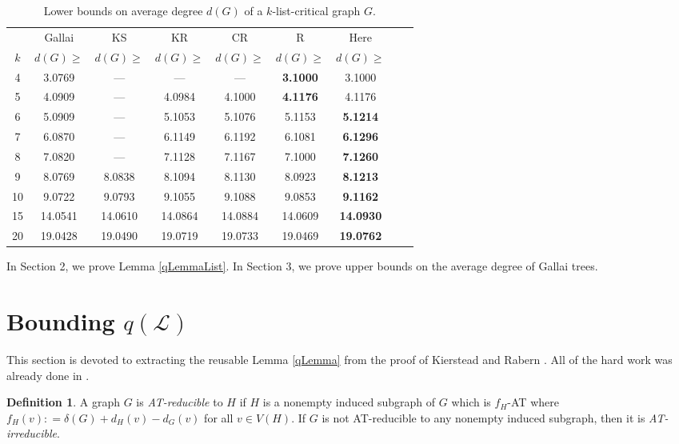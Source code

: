 \documentclass[10pt]{article}
\theoremstyle{plain}
\theoremstyle{definition}
\newtheorem{defn}{Definition}
\theoremstyle{remark}
\newcommand{\fancy}[1]{\mathcal{#1}}
\renewcommand{\L}{\fancy{L}}
\newcommand{\DefinedAs}{\mathrel{\mathop:}=}
\begin{document}
\begin{table}
	\begin{center}
		\begin{tabular}{|c|c|c|c|c|c|c|c|c|}
			\hline
			& Gallai \cite{gallai1963kritische}
			& KS \cite{kostochkastiebitzedgesincriticalgraph} 
			& KR \cite{OreVizing}
			& CR \cite{DischargingLowerBound}
			& R \cite{Better4ListCriticalBound}
			& Here \\
			$k$ & $d(G) \ge$ & $d(G) \ge$ & $d(G) \ge$ & $d(G) \ge$ & $d(G) \ge$ & $d(G) \ge$\\
			\hline 
			4 & 3.0769 & --- & --- & --- & \bf{3.1000} & 3.1000\\
			5 & 4.0909 & --- & 4.0984 & 4.1000 & \bf{4.1176} & 4.1176\\
			6 & 5.0909 & --- & 5.1053 & 5.1076 & 5.1153 & \bf{5.1214}\\
			7 & 6.0870 & --- & 6.1149 & 6.1192} & 6.1081 & \bf{6.1296}\\
			8 & 7.0820 & --- & 7.1128 & 7.1167} & 7.1000 & \bf{7.1260}\\
			9 & 8.0769 & 8.0838 & 8.1094 & 8.1130} & 8.0923 & \bf{8.1213}\\
			10 & 9.0722 & 9.0793 & 9.1055 & 9.1088} & 9.0853 & \bf{9.1162}\\
			15 & 14.0541 & 14.0610 & 14.0864 & 14.0884} & 14.0609 & \bf{14.0930}\\
			20 & 19.0428 & 19.0490 & 19.0719 & 19.0733} & 19.0469 & \bf{19.0762}\\
			\hline
		\end{tabular}
	\end{center}
	\caption{Lower bounds on average degree $d(G)$ of a $k$-list-critical graph $G$.}
	\label{TheTable}
\end{table}

In Section 2, we prove Lemma \ref{qLemmaList}.
In Section 3, we prove upper bounds on the average degree of Gallai trees.

\section{Bounding $q(\L)$}
This section is devoted to extracting the reusable Lemma \ref{qLemma} from the proof of Kierstead and Rabern \cite{OreVizing}.
All of the hard work was already done in \cite{OreVizing}.

\begin{defn}
	A graph $G$ is \emph{AT-reducible} to $H$ if $H$ is a nonempty induced subgraph of $G$ which is $f_H$-AT where $f_H(v) \DefinedAs \delta(G) + d_H(v) - d_G(v)$ for all $v \in V(H)$.  
	If $G$ is not AT-reducible to any nonempty induced subgraph, then it is \emph{AT-irreducible}.
\end{defn}
\end{document}
